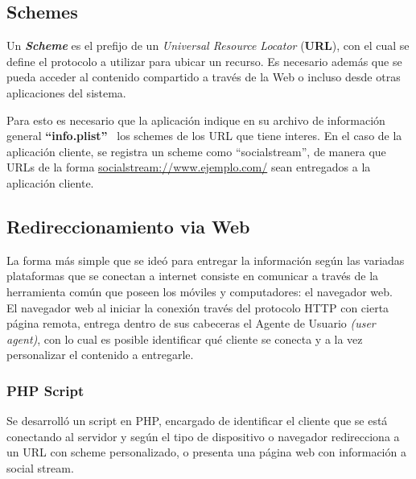 	\subsection{Schemes}
	Un \textbf{\textit{Scheme}} es el prefijo de un \textit{Universal Resource Locator} (\textbf{URL}), con el cual se define el protocolo a utilizar para ubicar un recurso.
	Es necesario además que se pueda acceder al contenido compartido a través de la Web o incluso desde otras aplicaciones del sistema.

Para esto es necesario que la aplicación indique en su archivo de información general \textbf{\textquotedblleft info.plist\textquotedblright}  \ los schemes de los URL que tiene interes.
En el caso de la aplicación cliente, se registra un scheme como \textquotedblleft socialstream\textquotedblright , de manera que URLs de la forma \url{socialstream://www.ejemplo.com/} sean entregados a la aplicación cliente.


	\subsection{Redireccionamiento via Web}
La forma más simple que se ideó para entregar la información según las variadas plataformas que se conectan a internet consiste en comunicar a través de la herramienta común que poseen los móviles y computadores: el navegador web.\\

El navegador web al iniciar la conexión través del protocolo HTTP con cierta página remota, entrega dentro de sus cabeceras el Agente de Usuario \textit{(user agent)}, con lo cual es posible identificar qué cliente se conecta y a la vez personalizar el contenido a entregarle.

		\subsubsection{PHP Script}
Se desarrolló un script en PHP, encargado de identificar el cliente que se está conectando al servidor y según el tipo de dispositivo o navegador redirecciona a un URL con scheme personalizado, o presenta una página web con información a social stream.

